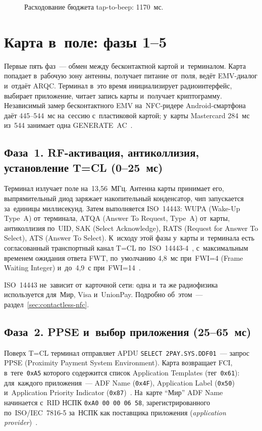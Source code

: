 \begin{figure}[htbp]
  \centering
  \caption{Расходование бюджета tap-to-beep: 1170~мс.}%
  \label{fig:one-tap-budget}
\end{figure}
\FloatBarrier

\section{Карта в~поле: фазы 1--5}\label{sec:one-tap-card-terminal}

Первые пять фаз~--- обмен между бесконтактной картой и~терминалом. Карта попадает
в~рабочую зону антенны, получает питание от~поля, ведёт EMV-диалог и~отдаёт
ARQC. Терминал в~это время инициализирует радиоинтерфейс, выбирает приложение,
читает запись карты и~получает криптограмму. Независимый замер бесконтактного
EMV на~NFC-ридере Android-смартфона даёт 445--544~мс на~сессию с~пластиковой
картой; у~карты Mastercard 284~мс из~544 занимает одна
GENERATE~AC~\cite{lifecycleintegrity-emv-timing}.

\subsection*{Фаза~1. RF-активация, антиколлизия, установление T=CL (0--25~мс)}

Терминал излучает поле на~13{,}56~МГц. Антенна карты принимает его, выпрямительный
диод заряжает накопительный конденсатор, чип запускается за~единицы миллисекунд.
Затем выполняется ISO~14443: WUPA (Wake-Up Type~A) от~терминала, ATQA (Answer To
Request, Type~A) от~карты, антиколлизия по~UID, SAK (Select Acknowledge),
RATS (Request for Answer To Select), ATS (Answer To Select). К~исходу этой
фазы у~карты и~терминала есть согласованный транспортный канал T=CL
по~ISO~14443-4~\cite{iso-14443-3,iso-14443-4}, с~максимальным временем ожидания
ответа FWT, по~умолчанию 4{,}8~мс при~FWI=4 (Frame Waiting Integer) и~до~4{,}9~с
при~FWI=14~\cite{iso-14443-4}.

ISO~14443 не~зависит от~карточной сети: одна и~та же радиофизика используется
для~Мир, Visa и~UnionPay. Подробно об~этом~--- раздел~\ref{sec:contactless-nfc}.

\subsection*{Фаза~2. PPSE и~выбор приложения (25--65~мс)}

Поверх T=CL терминал отправляет APDU \texttt{SELECT 2PAY.SYS.DDF01}~--- запрос
PPSE (Proximity Payment System Environment). Карта возвращает FCI, в~теге~\texttt{0xA5}
которого содержится список Application Templates (тег~\texttt{0x61}): для~каждого приложения~---
ADF Name (\texttt{0x4F}), Application Label (\texttt{0x50}) и~Application Priority Indicator
(\texttt{0x87})~\cite{emvco-contactless-book-b}. На~карте \enquote{Мир} ADF Name начинается
с~RID НСПК \texttt{0xA0~00~00~06~58}, зарегистрированного по~ISO/IEC~7816-5
за~НСПК как поставщика приложения (\textit{application provider})~\cite{iso-7816-5}.

